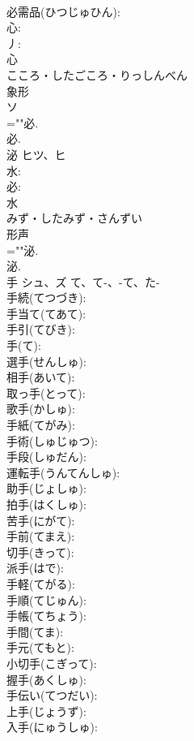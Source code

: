 \documentclass[8pt]{extreport}
\begin{document}
\begin{CJK}{UTF8}{min}
\\	必需品(ひつじゅひん): 
\\	心: 
\\	丿: 
\\	心	
\\	こころ・したごころ・りっしんべん	
\\	象形 
\\	ソ 
\\	=""必.
\\	必.
\\	泌	ヒツ、ヒ			
\\	水: 
\\	必: 
\\	水	
\\	みず・したみず・さんずい	
\\	形声 
\\	=""泌.
\\	泌.
\\	手	シュ、ズ	て、て-、-て、た-		
\\	手続(てつづき): 
\\	手当て(てあて): 
\\	手引(てびき): 
\\	手(て): 
\\	選手(せんしゅ): 
\\	相手(あいて): 
\\	取っ手(とって): 
\\	歌手(かしゅ): 
\\	手紙(てがみ): 
\\	手術(しゅじゅつ): 
\\	手段(しゅだん): 
\\	運転手(うんてんしゅ): 
\\	助手(じょしゅ): 
\\	拍手(はくしゅ): 
\\	苦手(にがて): 
\\	手前(てまえ): 
\\	切手(きって): 
\\	派手(はで): 
\\	手軽(てがる): 
\\	手順(てじゅん): 
\\	手帳(てちょう): 
\\	手間(てま): 
\\	手元(てもと): 
\\	小切手(こぎって): 
\\	握手(あくしゅ): 
\\	手伝い(てつだい): 
\\	上手(じょうず): 
\\	入手(にゅうしゅ): 

\end{CJK}
\end{document}
